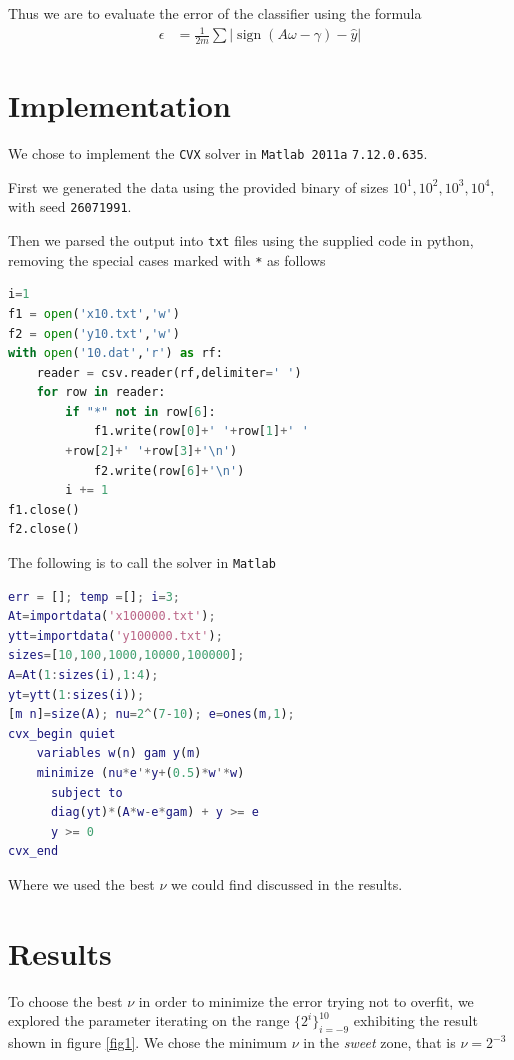 \documentclass[a4paper,10pt,twocolumn]{article}
\DeclareMathOperator{\sign}{\mathrm{sign}}
\begin{document}
Thus we are to evaluate the error of the classifier using the formula 
\begin{equation}
\begin{aligned}
\epsilon&=\frac{1}{2m}\sum|\sign(A\omega-\gamma)-\hat{y}|
\end{aligned}
\end{equation}

\section*{Implementation}
We chose to implement the \texttt{CVX} solver in \texttt{Matlab 2011a}  \texttt{7.12.0.635}.

First we generated the data using the provided binary of sizes $10^1,10^2,10^3,10^4$, with seed \texttt{26071991}.

Then we parsed the output into \texttt{txt} files using the supplied code in python, removing the special cases marked with \texttt{*} as follows

\begin{lstlisting}[language=python]
i=1
f1 = open('x10.txt','w')
f2 = open('y10.txt','w')
with open('10.dat','r') as rf:
    reader = csv.reader(rf,delimiter=' ')
    for row in reader:
        if "*" not in row[6]:
            f1.write(row[0]+' '+row[1]+' '
		+row[2]+' '+row[3]+'\n')
            f2.write(row[6]+'\n')
        i += 1
f1.close() 
f2.close()
\end{lstlisting}

The following is to call the solver in \texttt{Matlab}

\begin{lstlisting}[language=matlab]
err = []; temp =[]; i=3;
At=importdata('x100000.txt');
ytt=importdata('y100000.txt');
sizes=[10,100,1000,10000,100000];
A=At(1:sizes(i),1:4);
yt=ytt(1:sizes(i));
[m n]=size(A); nu=2^(7-10); e=ones(m,1);
cvx_begin quiet
    variables w(n) gam y(m)
    minimize (nu*e'*y+(0.5)*w'*w)
      subject to
      diag(yt)*(A*w-e*gam) + y >= e 
      y >= 0
cvx_end
\end{lstlisting}

Where we used the best $\nu$ we could find discussed in the results.
\section*{Results}
To choose the best $\nu$ in order to minimize the error trying not to overfit, we explored the parameter iterating on the range $\{2^{i}\}_{i=-9}^{10}$ exhibiting the result shown in figure \ref{fig1}. We chose the minimum $\nu$ in the \emph{sweet} zone, that is $\nu=2^{-3}$
\end{document}
